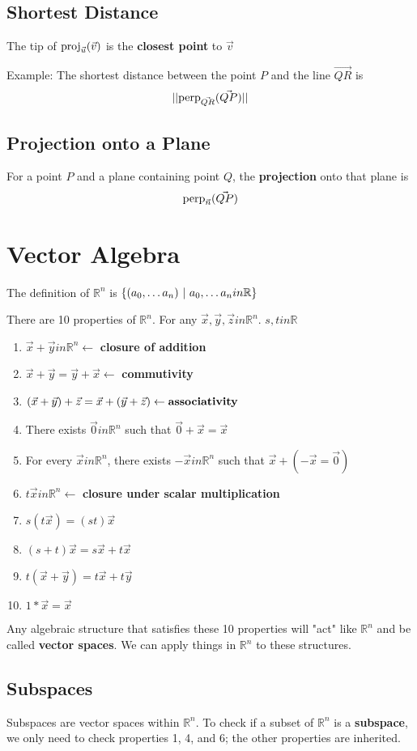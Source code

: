 \documentclass[12pt]{article}
\newcommand{\perpp}[2]{{\rm perp}_{\vec{#2}} (\vec{#1})}
\newcommand{\proj}[2]{{\rm proj}_{\vec{#2}} (\vec{#1})}
\newcommand{\R}[1]{\mathbb{R}^{#1}}
\begin{document}
\subsection*{Shortest Distance}
The tip of $\proj{v}{u}$ is the {\bf closest point} to $\vec{v}$

Example: The shortest distance between the point $P$ and the line $\vec{QR}$ is \[ ||\perpp{QP}{QR}|| \]

\subsection*{Projection onto a Plane}
For a point $P$ and a plane containing point $Q$, the {\bf projection} onto that plane is \[ \perpp{QP}{n} \]

\section*{Vector Algebra}
The definition of $\R{n}$ is $\{(a_0,\dots a_n)\ |\  a_0,\dots a_nin\mathbb{R}\}$

There are 10 properties of $\R{n}$. For any $\vec{x}, \vec{y}, \vec{z}in\R{n}$. $s,tin\mathbb{R}$
\begin{enumerate}
\item $\vec{x} + \vec{y}in\R{n} \leftarrow$ {\bf closure of addition}
\item $\vec{x} + \vec{y} = \vec{y} + \vec{x} \leftarrow$ {\bf commutivity}
\item $(\vec{x} + \vec{y}) + \vec{z} = \vec{x} + (\vec{y} + \vec{z}) \leftarrow {\bf associativity}$
\item There exists $\vec{0}in\R{n}$ such that $\vec{0} + \vec{x} = \vec{x}$
\item For every $\vec{x}in\R{n}$, there exists $-\vec{x}in\R{n}$ such that $\vec{x} + (-\vec{x} = \vec{0})$
\item $t\vec{x}in\R{n} \leftarrow$ {\bf closure under scalar multiplication}
\item $s(t\vec{x}) = (st)\vec{x}$
\item $(s+t)\vec{x} = s\vec{x} + t\vec{x}$
\item $t(\vec{x} + \vec{y}) = t\vec{x} + t\vec{y}$
\item $1*\vec{x} = \vec{x}$
\end{enumerate}
Any algebraic structure that satisfies these 10 properties will "act" like $\R{n}$ and be called {\bf vector spaces}. We can apply things in $\R{n}$ to these structures.

\subsection*{Subspaces}
Subspaces are vector spaces within $\R{n}$. To check if a subset of $\R{n}$ is a {\bf subspace}, we only need to check properties 1, 4, and 6; the other properties are inherited.
\end{document}
